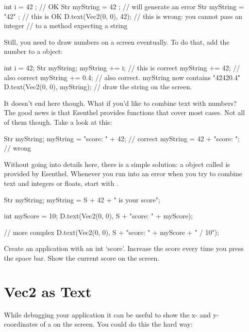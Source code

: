 \begin{code}
int i        =  42    ; // OK
Str myString =  42    ; // will generate an error
Str myString = "42"   ; // this is OK
D.text(Vec2(0, 0), 42); // this is wrong: you cannot pass an integer 
                        // to a method expecting a string
\end{code}

Still, you need to draw numbers on a screen eventually. To do that, add the number to a  object:

\begin{code}
int i = 42;
Str myString;
myString +=   i; // this is correct
myString +=  42; // also correct
myString += 0.4; // also correct. myString now contains "42420.4"
D.text(Vec2(0, 0), myString); // draw the string on the screen.
\end{code}

It doesn't end here though. What if you'd like to combine text with numbers? The good news is that Esenthel provides functions that cover most cases. Not all of them though. Take a look at this:
\begin{code}
Str myString;
myString = "score: " + 42; // correct
myString = 42 + "score: "; // wrong
\end{code}
 
Without going into details here, there is a simple solution: a  object called  is provided by Esenthel. Whenever you run into an error when you try to combine text and integers or floats, start with .

\begin{code}
Str myString;
myString = S + 42  + " is your score"; 

int myScore = 10;
D.text(Vec2(0, 0), S + "score: " + myScore);

// more complex
D.text(Vec2(0, 0), S + "score: " + myScore + " / 10");
\end{code}

\begin{exercise}
Create an application with an int `score'. Increase the score every time you press the space bar. Show the current score on the screen.
\end{exercise}

\section{Vec2 as Text}
While debugging your application it can be useful to show the x- and y-coordinates of a  on the screen. You could do this the hard way:

